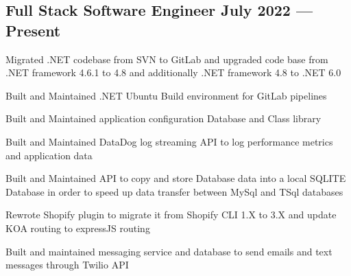 \documentclass[letter,10pt]{article}
\begin{document}
\subsection{{Full Stack Software Engineer \hfill July 2022 --- Present}}
\begin{zitemize}
\item Migrated .NET codebase from SVN to GitLab and upgraded code base from .NET framework 4.6.1 to 4.8 and additionally .NET framework 4.8 to .NET 6.0
\item Built and Maintained .NET Ubuntu Build environment for GitLab pipelines
\item Built and Maintained application configuration Database and Class library
\item Built and Maintained DataDog log streaming API to log performance metrics and application data
\item Built and Maintained API to copy and store Database data into a local SQLITE Database in order to speed up data transfer between MySql and TSql databases
\item Rewrote Shopify plugin to migrate it from Shopify CLI 1.X to 3.X and update KOA routing to expressJS routing
\item Built and maintained messaging service and database to send emails and text messages through Twilio API
\end{zitemize}
\end{document}

